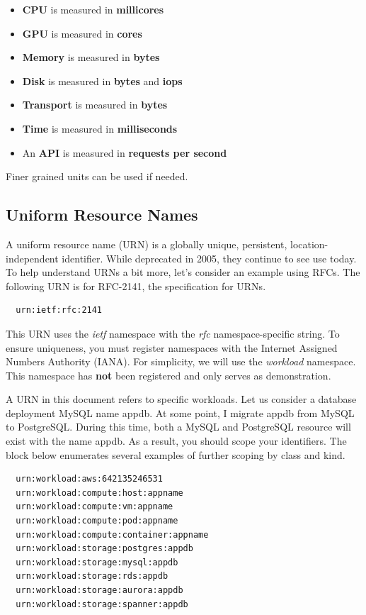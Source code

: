 \documentclass[10pt, a4paper, twocolumn]{article}
\begin{document}
    \begin{itemize}
      \item \textbf{CPU} is measured in \textbf{millicores}
      \item \textbf{GPU} is measured in \textbf{cores}
      \item \textbf{Memory} is measured in \textbf{bytes}
      \item \textbf{Disk} is measured in \textbf{bytes} and \textbf{iops}
      \item \textbf{Transport} is measured in \textbf{bytes}
      \item \textbf{Time} is measured in \textbf{milliseconds}
      \item An \textbf{API} is measured in \textbf{requests per second}
    \end{itemize}

    Finer grained units can be used if needed.

  \subsection*{Uniform Resource Names}
    A uniform resource name (URN) is a globally unique, persistent, location-independent identifier.
    While deprecated in 2005, they continue to see use today.
    To help understand URNs a bit more, let's consider an example using RFCs.
    The following URN is for RFC-2141, the specification for URNs.

\begin{verbatim}
  urn:ietf:rfc:2141
\end{verbatim}

    This URN uses the \textit{ietf} namespace with the \textit{rfc} namespace-specific string.
    To ensure uniqueness, you must register namespaces with the Internet Assigned Numbers Authority (IANA).
    For simplicity, we will use the \textit{workload} namespace.
    This namespace has \textbf{not} been registered and only serves as demonstration.

    A URN in this document refers to specific workloads.
    Let us consider a database deployment MySQL name appdb.
    At some point, I migrate appdb from MySQL to PostgreSQL.
    During this time, both a MySQL and PostgreSQL resource will exist with the name appdb.
    As a result, you should scope your identifiers.
    The block below enumerates several examples of further scoping by class and kind.

\begin{verbatim}
  urn:workload:aws:642135246531
  urn:workload:compute:host:appname
  urn:workload:compute:vm:appname
  urn:workload:compute:pod:appname
  urn:workload:compute:container:appname
  urn:workload:storage:postgres:appdb
  urn:workload:storage:mysql:appdb
  urn:workload:storage:rds:appdb
  urn:workload:storage:aurora:appdb
  urn:workload:storage:spanner:appdb
\end{verbatim}
\end{document}
